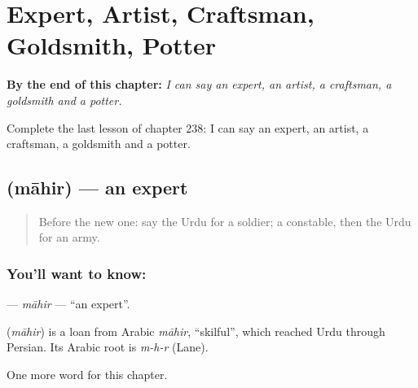 
\chapter{Expert, Artist, Craftsman, Goldsmith, Potter}
\label{ch:ur-expert-artist-craftsman-goldsmith-potter}

\begin{chapteropening}
\textbf{By the end of this chapter:} \emph{I can say an expert, an artist, a craftsman, a goldsmith and a potter.}

Complete the last lesson of chapter 238: I can say an expert, an artist, a craftsman, a goldsmith and a potter.
\end{chapteropening}

\section[\texorpdfstring{\ur{ماہر} (māhir)}{ماہر (māhir)}]{ (māhir) — an expert}

\label{lesson:UR-C238-mahir}



\begin{quote}
Before the new one: say the Urdu for a soldier; a constable, then the Urdu for an army.
\end{quote}

\subsection*{You'll want to know: }
\textbf{} — \emph{māhir} — \textquotedblleft{}an expert\textquotedblright{}.

\begin{cousinweb}
\textbf{} (\emph{māhir}) is a loan from Arabic \emph{māhir}, \textquotedblleft{}skilful\textquotedblright{}, which reached Urdu through Persian. Its Arabic root is \emph{m-h-r} (Lane).
\end{cousinweb}

\begin{grammarlens}[title={What you've built}]
One more word for this chapter.
\end{grammarlens}

